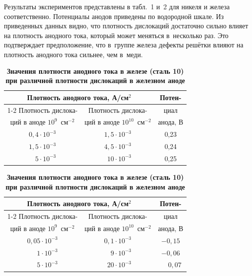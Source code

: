 \smallskip

 Результаты экспериментов представлены в табл.~1 и~2 для никеля и железа
соответственно. Потенциалы анодов приведены по водородной шкале.
Из приведенных данных видно, что плотность дислокаций достаточно
сильно влияет на плотность анодного тока, который может меняться в~несколько раз. 
Это подтверждает предположение, что в~группе железа дефекты решётки влияют на плотность анодного тока сильнее, чем в~меди.


\begin{table}
  \centering 
 \footnotesize
\caption{\footnotesize \bf Значения плотности анодного тока в никеле  при различной
плотности дислокаций в никелевом аноде}\vspace{-3mm}
\begin{tabular}{c|c|c} \hline
\multicolumn{2}{c|}{\scriptsize Плотность анодного тока, А/см$^2$} & \scriptsize Потен-\\ \cline{1-2}
\scriptsize Плотность дислока-     &\scriptsize Плотность дислока-        &  \scriptsize циал    \\
\scriptsize ций в аноде $10^9$~см$^{-2}$ &\scriptsize ций в аноде $10^{10}$~см$^{-2}$ &  \scriptsize  анода, В \\
 \hline
 \rule{0mm}{12pt}%
$0,4 \cdot 10^{-3}$  &   $1,5 \cdot 10^{-3}$ &   0,23 \\ 
$1,5 \cdot 10^{-3}$ &   $4,5 \cdot 10^{-3}$ &   0,24 \\ 
$\phantom{1,}5 \cdot 10^{-3}$    &   $\phantom{,}10 \cdot 10^{-3}$  &   0,25 \\ \hline
\end{tabular}

\bigskip

\caption{\bf Значения плотности анодного тока в железе (сталь 10) при
различной плотности дислокаций в железном аноде}\vspace{-3mm}
\begin{tabular}{c|c|c} \hline
\multicolumn{2}{c|}{\scriptsize Плотность анодного тока, А/см$^2$} & \scriptsize Потен-\\ \cline{1-2}
\scriptsize Плотность дислока-     &\scriptsize Плотность дислока-        &  \scriptsize циал    \\
\scriptsize ций в аноде $10^9$~см$^{-2}$ &\scriptsize ций в аноде $10^{10}$~см$^{-2}$ &  \scriptsize  анода, В \\
 \hline
 \rule{0mm}{12pt}%
$0,05 \cdot 10^{-3}$  &   $0,1 \cdot 10^{-3}$ &   $-0,15$ \\ 
$\phantom{0,0}1 \cdot 10^{-3}$ &   $\phantom{0,}9 \cdot 10^{-3}$ &   $-0,06$ \\ 
$\phantom{0,0}5 \cdot 10^{-3}$    &   $\phantom{,}20 \cdot 10^{-3}$  &   $\phantom{-}0,07$ \\ \hline
\end{tabular}

\end{table}




